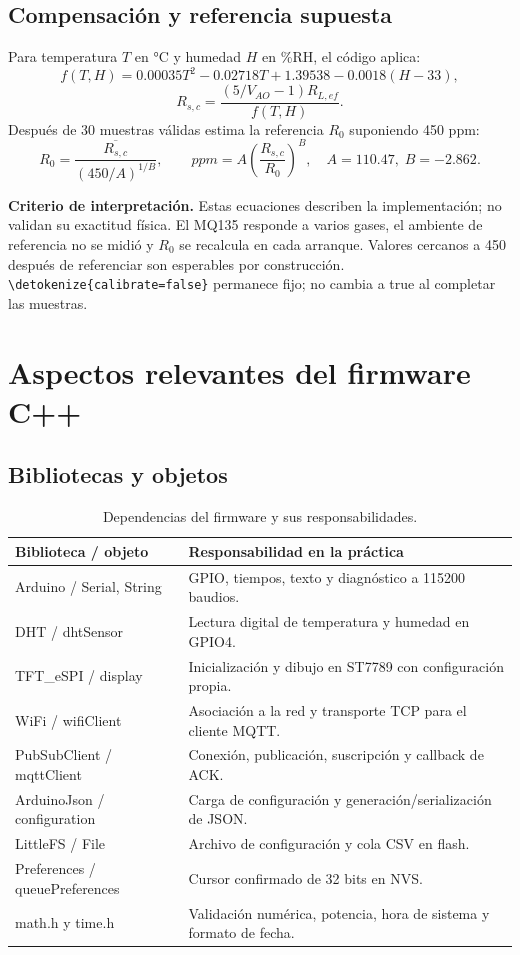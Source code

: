\documentclass[11pt,a4paper]{article}
\newcommand{\code}[1]{\expandafter\nolinkurl\expandafter{\detokenize{#1}}}
\newcommand{\note}[1]{\par\smallskip\noindent\colorbox{pale}{\parbox{\dimexpr\linewidth-14pt\relax}{\small\textbf{Criterio de interpretación.} #1}}\par\smallskip}
\newcommand{\nextsection}[1]{\clearpage\section{#1}}
\begin{document}
\subsection{Compensación y referencia supuesta}
Para temperatura $T$ en °C y humedad $H$ en \%RH, el código aplica:
\[
f(T,H)=0.00035T^2-0.02718T+1.39538-0.0018(H-33),
\]
\[
R_{s,c}=\frac{(5/V_{AO}-1)R_{L,ef}}{f(T,H)}.
\]
Después de 30 muestras válidas estima la referencia $R_0$ suponiendo 450 ppm:
\[
R_0=\frac{\overline{R_{s,c}}}{(450/A)^{1/B}},\qquad
ppm=A\left(\frac{R_{s,c}}{R_0}\right)^B,
\quad A=110.47,\;B=-2.862.
\]
\note{Estas ecuaciones describen la implementación; no validan su exactitud física. El MQ135 responde a varios gases, el ambiente de referencia no se midió y $R_0$ se recalcula en cada arranque. Valores cercanos a 450 después de referenciar son esperables por construcción. \code{calibrate=false} permanece fijo; no cambia a true al completar las muestras.}

\nextsection{Aspectos relevantes del firmware C++}
\subsection{Bibliotecas y objetos}
\begin{table}[h!]
\small
\begin{tabularx}{\linewidth}{@{}P{39mm}Y@{}}
\toprule
\textbf{Biblioteca / objeto} & \textbf{Responsabilidad en la práctica}\\\midrule
Arduino / Serial, String & GPIO, tiempos, texto y diagnóstico a 115200 baudios.\\
DHT / dhtSensor & Lectura digital de temperatura y humedad en GPIO4.\\
TFT\_eSPI / display & Inicialización y dibujo en ST7789 con configuración propia.\\
WiFi / wifiClient & Asociación a la red y transporte TCP para el cliente MQTT.\\
PubSubClient / mqttClient & Conexión, publicación, suscripción y callback de ACK.\\
ArduinoJson / configuration & Carga de configuración y generación/serialización de JSON.\\
LittleFS / File & Archivo de configuración y cola CSV en flash.\\
Preferences / queuePreferences & Cursor confirmado de 32 bits en NVS.\\
math.h y time.h & Validación numérica, potencia, hora de sistema y formato de fecha.\\
\bottomrule
\end{tabularx}
\caption{Dependencias del firmware y sus responsabilidades.}
\end{table}
\end{document}
